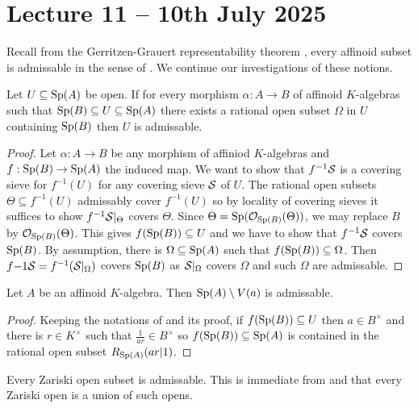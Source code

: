 \section{Lecture 11 -- 10th July 2025}\label{sec: lecture 11}
Recall from the Gerritzen-Grauert representability theorem , every affinoid subset is admissable in the sense of . We continue our investigations of these notions. 
\begin{lemma}\label{lem: sandwich implies admissable}
    Let $U\subseteq\mathrm{Sp}(A)$ be open. If for every morphism $\alpha:A\to B$ of affinoid $K$-algebras such that $\mathrm{Sp}(B)\subseteq U\subseteq\mathrm{Sp}(A)$ there exists a rational open subset $\Omega$ in $U$ containing $\mathrm{Sp}(B)$ then $U$ is admissable. 
\end{lemma}
\begin{proof}
    Let $\alpha:A\to B$ be any morphism of affiniod $K$-algebras and $f:\mathrm{Sp}(B)\to\mathrm{Sp}(A)$ the induced map. We want to show that $f^{-1}\mathcal{S}$ is a covering sieve for $f^{-1}(U)$ for any covering sieve $\mathcal{S}$ of $U$. The rational open subsets $\Theta\subseteq f^{-1}(U)$ admissably cover $f^{-1}(U)$ so by locality of covering sieves it suffices to show $f^{-1}\mathcal{S}|_{\Theta}$ covers $\Theta$. Since $\Theta=\mathrm{Sp}(\mathcal{O}_{\mathrm{Sp}(B)}(\Theta))$, we may replace $B$ by $\mathcal{O}_{\mathrm{Sp}(B)}(\Theta)$. This gives $f(\mathrm{Sp}(B))\subseteq U$ and we have to show that $f^{-1}\mathcal{S}$ covers $\mathrm{Sp}(B)$. By assumption, there is $\Omega\subseteq\mathrm{Sp}(A)$ such that $f(\mathrm{Sp}(B))\subseteq\Omega$. Then $f{-1}\mathcal{S}=f^{-1}(\mathcal{S}|_{\Omega})$ covers $\mathrm{Sp}(B)$ as $\mathcal{S}|_{\Omega}$ covers $\Omega$ and such $\Omega$ are admissable. 
\end{proof}
\begin{lemma}\label{lem: distinguished opens are admissable}
    Let $A$ be an affinoid $K$-algebra. Then $\mathrm{Sp}(A)\setminus V(a)$ is admissable. 
\end{lemma}
\begin{proof}
    Keeping the notations of  and its proof, if $f(\mathrm{Sp}(B))\subseteq U$ then $a\in B^{\times}$ and there is $r\in K^{\times}$ such that $\frac{1}{ar}\in B^{\times}$ so $f(\mathrm{Sp}(B))\subseteq\mathrm{Sp}(A)$ is contained in the rational open subset $R_{\mathrm{Sp}(A)}(ar|1)$. 
\end{proof}
\begin{example}
    Every Zariski open subset is admissable. This is immediate from  and that every Zariski open is a union of such opens. 
\end{example}
